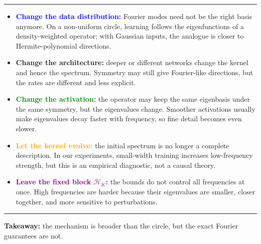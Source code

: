 \documentclass[aspectratio=169,9pt]{beamer}
\begin{document}
\begin{frame}
	\vspace{1mm}
	{\color{line}\rule{\linewidth}{0.35pt}}

	\vspace{1.5mm}
	{\scriptsize
		\begin{itemize}
			\setlength{\itemsep}{2.2mm}

			\pause
			\item \textcolor{blue}{\bfseries Change the data distribution:}
			      Fourier modes need not be the right basis anymore.
			      On a non-uniform circle, learning follows the eigenfunctions of a density-weighted operator; with Gaussian inputs, the analogue is closer to Hermite-polynomial directions.

			      \pause
			\item \textcolor{tudcyan}{\bfseries Change the architecture:}
			      deeper or different networks change the kernel and hence the spectrum.
			      Symmetry may still give Fourier-like directions, but the rates are different and less explicit.

			      \pause
			\item \textcolor{green}{\bfseries Change the activation:}
			      the operator may keep the same eigenbasis under the same symmetry, but the eigenvalues change.
			      Smoother activations usually make eigenvalues decay faster with frequency, so fine detail becomes even slower.

			      \pause
			\item \textcolor{orange}{\bfseries Let the kernel evolve:}
			      the initial spectrum is no longer a complete description.
			      In our experiments, small-width training increases low-frequency strength, but this is an empirical diagnostic, not a causal theory.

			      \pause
			\item \textcolor{purple}{\bfseries Leave the fixed block \(\mathcal H_K\):}
			      the bounds do not control all frequencies at once.
			      High frequencies are harder because their eigenvalues are smaller, closer together, and more sensitive to perturbations.
		\end{itemize}
	}

	\vspace{1mm}
	{\color{line}\rule{\linewidth}{0.35pt}}

	\vspace{1mm}
	\centering
	\pause
	{\scriptsize\bfseries Takeaway:}
	{\scriptsize the mechanism is broader than the circle, but the exact Fourier guarantees are not.}
\end{frame}
\end{document}
